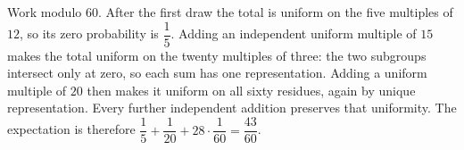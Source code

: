 Work modulo $60$. After the first draw the total is uniform on the five multiples of $12$, so its zero probability is $\dfrac{1}{5}$. Adding an independent uniform multiple of $15$ makes the total uniform on the twenty multiples of three: the two subgroups intersect only at zero, so each sum has one representation. Adding a uniform multiple of $20$ then makes it uniform on all sixty residues, again by unique representation. Every further independent addition preserves that uniformity. The expectation is therefore $\dfrac{1}{5}+\dfrac{1}{20}+28\cdot\dfrac{1}{60}=\boxed{\dfrac{43}{60}}$.
